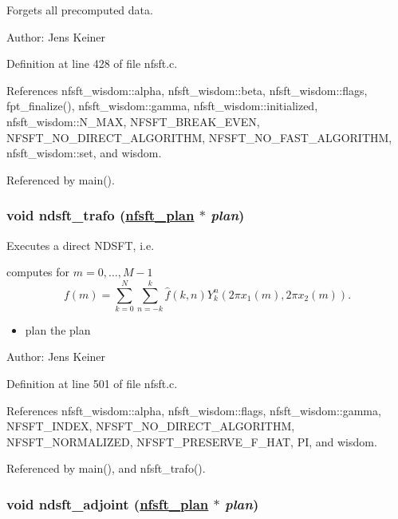 Forgets all precomputed data. 

\begin{Desc}
\item[Author:]Jens Keiner \end{Desc}


Definition at line 428 of file nfsft.c.

References nfsft\_\-wisdom::alpha, nfsft\_\-wisdom::beta, nfsft\_\-wisdom::flags, fpt\_\-finalize(), nfsft\_\-wisdom::gamma, nfsft\_\-wisdom::initialized, nfsft\_\-wisdom::N\_\-MAX, NFSFT\_\-BREAK\_\-EVEN, NFSFT\_\-NO\_\-DIRECT\_\-ALGORITHM, NFSFT\_\-NO\_\-FAST\_\-ALGORITHM, nfsft\_\-wisdom::set, and wisdom.

Referenced by main().\hypertarget{group__nfsft_ga6}{
\subsubsection[ndsft\_\-trafo]{\setlength{\rightskip}{0pt plus 5cm}void ndsft\_\-trafo (\hyperlink{structnfsft__plan}{nfsft\_\-plan} $\ast$ {\em plan})}}
\label{group__nfsft_ga6}


Executes a direct NDSFT, i.e. 

computes for $m = 0,\ldots,M-1$ \[ f(m) = \sum_{k=0}^N \sum_{n=-k}^k \hat{f}(k,n) Y_k^n\left(2\pi x_1(m), 2\pi x_2(m)\right). \]

\begin{itemize}
\item plan the plan\end{itemize}
\begin{Desc}
\item[Author:]Jens Keiner \end{Desc}


Definition at line 501 of file nfsft.c.

References nfsft\_\-wisdom::alpha, nfsft\_\-wisdom::flags, nfsft\_\-wisdom::gamma, NFSFT\_\-INDEX, NFSFT\_\-NO\_\-DIRECT\_\-ALGORITHM, NFSFT\_\-NORMALIZED, NFSFT\_\-PRESERVE\_\-F\_\-HAT, PI, and wisdom.

Referenced by main(), and nfsft\_\-trafo().\hypertarget{group__nfsft_ga7}{
\subsubsection[ndsft\_\-adjoint]{\setlength{\rightskip}{0pt plus 5cm}void ndsft\_\-adjoint (\hyperlink{structnfsft__plan}{nfsft\_\-plan} $\ast$ {\em plan})}}
\label{group__nfsft_ga7}


